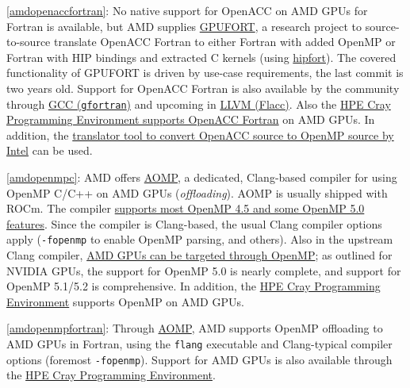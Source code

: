 \item \ref{amdopenaccfortran}: No native support for OpenACC on AMD GPUs for Fortran is available, but AMD supplies \href{https://github.com/ROCmSoftwarePlatform/gpufort}{GPUFORT}, a research project to source-to-source translate OpenACC Fortran to either Fortran with added OpenMP or Fortran with HIP bindings and extracted C kernels (using \href{https://github.com/ROCmSoftwarePlatform/hipfort}{hipfort}). The covered functionality of GPUFORT is driven by use-case requirements, the last commit is two years old. Support for OpenACC Fortran is also available by the community through \href{https://gcc.gnu.org/onlinedocs/gfortran/OpenACC.html}{GCC (\texttt{gfortran})} and upcoming in \href{https://ieeexplore.ieee.org/document/9651310}{LLVM (Flacc)}. Also the \href{https://cpe.ext.hpe.com/docs/cce/man7/intro_openacc.7.html}{HPE Cray Programming Environment supports OpenACC Fortran} on AMD GPUs. In addition, the \href{https://github.com/intel/intel-application-migration-tool-for-openacc-to-openmp}{translator tool to convert OpenACC source to OpenMP source by Intel} can be used.
\item \ref{amdopenmpc}: AMD offers \href{https://github.com/ROCm-Developer-Tools/aomp}{AOMP}, a dedicated, Clang-based compiler for using OpenMP C/C++ on AMD GPUs (\emph{offloading}). AOMP is usually shipped with ROCm. The compiler \href{https://www.exascaleproject.org/wp-content/uploads/2022/02/Elwasif-ECP-sollve_vv_final.pdf}{supports most OpenMP 4.5 and some OpenMP 5.0 features}. Since the compiler is Clang-based, the usual Clang compiler options apply (\texttt{-fopenmp} to enable OpenMP parsing, and others). Also in the upstream Clang compiler, \href{https://clang.llvm.org/docs/OffloadingDesign.html}{AMD GPUs can be targeted through OpenMP}; as outlined for NVIDIA GPUs, the support for OpenMP 5.0 is nearly complete, and support for OpenMP 5.1/5.2 is comprehensive. In addition, the \href{https://cpe.ext.hpe.com/docs/cce/man7/intro_openmp.7.html}{HPE Cray Programming Environment} supports OpenMP on AMD GPUs.
\item \ref{amdopenmpfortran}: Through \href{https://github.com/ROCm-Developer-Tools/aomp}{AOMP}, AMD supports OpenMP offloading to AMD GPUs in Fortran, using the \texttt{flang} executable and Clang-typical compiler options (foremost \texttt{-fopenmp}). Support for AMD GPUs is also available through the \href{https://cpe.ext.hpe.com/docs/cce/man7/intro_openmp.7.html}{HPE Cray Programming Environment}.
